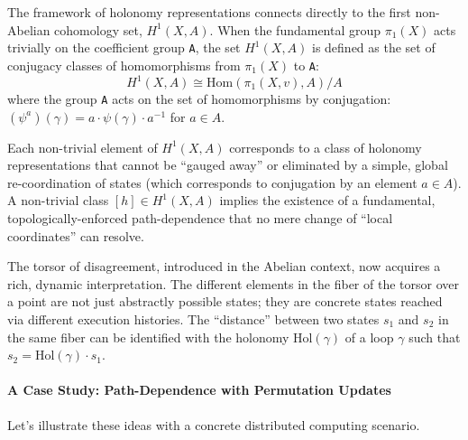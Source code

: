 \documentclass[
]{article}
\begin{document}
The framework of holonomy representations connects directly to the first
non-Abelian cohomology set, \(H^1(X, A)\). When the fundamental group
\(\pi_1(X)\) acts trivially on the coefficient group \texttt{A}, the set
\(H^1(X, A)\) is defined as the set of conjugacy classes of
homomorphisms from \(\pi_1(X)\) to \texttt{A}:
\[ H^1(X, A) \cong \text{Hom}(\pi_1(X, v), A) / A \] where the group
\texttt{A} acts on the set of homomorphisms by conjugation:
\((\psi^a)(\gamma) = a \cdot \psi(\gamma) \cdot a^{-1}\) for
\(a \in A\).

Each non-trivial element of \(H^1(X, A)\) corresponds to a class of
holonomy representations that cannot be ``gauged away'' or eliminated by
a simple, global re-coordination of states (which corresponds to
conjugation by an element \(a \in A\)). A non-trivial class
\([h] \in H^1(X, A)\) implies the existence of a fundamental,
topologically-enforced path-dependence that no mere change of ``local
coordinates'' can resolve.

The torsor of disagreement, introduced in the Abelian context, now
acquires a rich, dynamic interpretation. The different elements in the
fiber of the torsor over a point are not just abstractly possible
states; they are concrete states reached via different execution
histories. The ``distance'' between two states \(s_1\) and \(s_2\) in
the same fiber can be identified with the holonomy
\(\text{Hol}(\gamma)\) of a loop \(\gamma\) such that
\(s_2 = \text{Hol}(\gamma) \cdot s_1\).

\paragraph{A Case Study: Path-Dependence with Permutation
Updates}\label{a-case-study-path-dependence-with-permutation-updates}

Let's illustrate these ideas with a concrete distributed computing
scenario.
\end{document}
